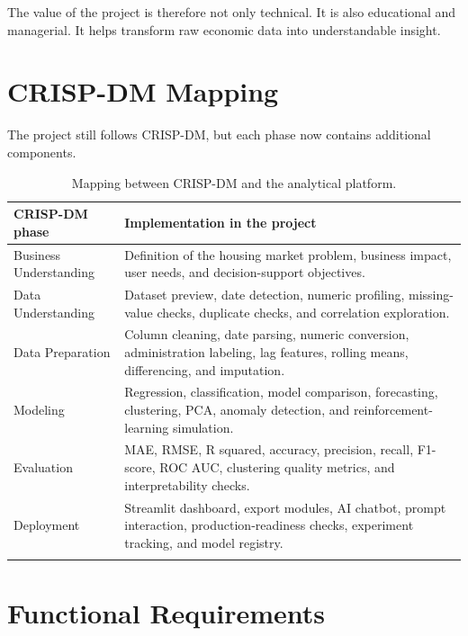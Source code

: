 The value of the project is therefore not only technical. It is also educational and managerial. It helps transform raw economic data into understandable insight.

\section{CRISP-DM Mapping}

The project still follows CRISP-DM, but each phase now contains additional components.

\begin{longtable}{p{4cm}p{11cm}}
\toprule
\textbf{CRISP-DM phase} & \textbf{Implementation in the project} \\
\midrule
Business Understanding & Definition of the housing market problem, business impact, user needs, and decision-support objectives. \\
Data Understanding & Dataset preview, date detection, numeric profiling, missing-value checks, duplicate checks, and correlation exploration. \\
Data Preparation & Column cleaning, date parsing, numeric conversion, administration labeling, lag features, rolling means, differencing, and imputation. \\
Modeling & Regression, classification, model comparison, forecasting, clustering, PCA, anomaly detection, and reinforcement-learning simulation. \\
Evaluation & MAE, RMSE, R squared, accuracy, precision, recall, F1-score, ROC AUC, clustering quality metrics, and interpretability checks. \\
Deployment & Streamlit dashboard, export modules, AI chatbot, prompt interaction, production-readiness checks, experiment tracking, and model registry. \\
\bottomrule
\caption{Mapping between CRISP-DM and the analytical platform.}
\end{longtable}

\section{Functional Requirements}


